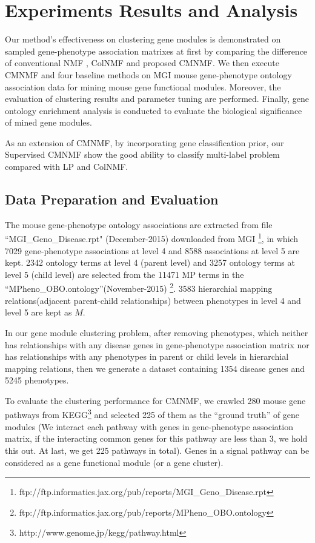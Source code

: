 \documentclass{bmcart}
\begin{document}
\section*{Experiments Results and Analysis}
Our method's effectiveness on clustering gene modules is demonstrated on sampled gene-phenotype association matrixes at first by comparing the difference of conventional NMF , ColNMF and proposed CMNMF. We then execute CMNMF and four baseline methods on MGI mouse gene-phenotype ontology association data for mining mouse gene functional modules. Moreover, the evaluation of clustering results and parameter tuning are performed. Finally, gene ontology enrichment analysis is conducted to evaluate the biological significance of mined gene modules.

As an extension of CMNMF, by incorporating gene classification prior, our Supervised CMNMF show the good ability to classify multi-label problem compared with LP and ColNMF.
\subsection*{\textbf{Data Preparation and Evaluation}}
 The mouse gene-phenotype ontology associations are extracted from file ``MGI\_Geno\_Disease.rpt" (December-2015) downloaded from MGI \footnote{ftp://ftp.informatics.jax.org/pub/reports/MGI\_Geno\_Disease.rpt}, in which 7029 gene-phenotype associations at level 4 and 8588 associations at level 5 are kept. 2342 ontology terms at level 4 (parent level) and 3257 ontology terms at level 5 (child level)  are selected from the 11471 MP terms in the ``MPheno\_OBO.ontology''(November-2015) \footnote{ftp://ftp.informatics.jax.org/pub/reports/MPheno\_OBO.ontology}. 3583 hierarchial mapping relations(adjacent parent-child relationships) between phenotypes in level 4 and level 5 are kept as $M$.

In our gene module clustering problem,
after removing phenotypes, which neither has relationships with any disease genes in gene-phenotype association matrix nor has relationships with any phenotypes in parent or child levels in hierarchial mapping relations, then we generate a dataset containing 1354 disease genes and 5245 phenotypes.

To evaluate the clustering performance for CMNMF, we crawled 280 mouse gene pathways from KEGG\footnote{http://www.genome.jp/kegg/pathway.html} and selected 225 of them as the ``ground truth'' of gene modules (We interact each pathway with genes in gene-phenotype association matrix, if the interacting common genes for this pathway are less than 3, we hold this out. At last, we get 225 pathways in total). Genes in a signal pathway can be considered as a gene functional module (or a gene cluster).
\end{document}
